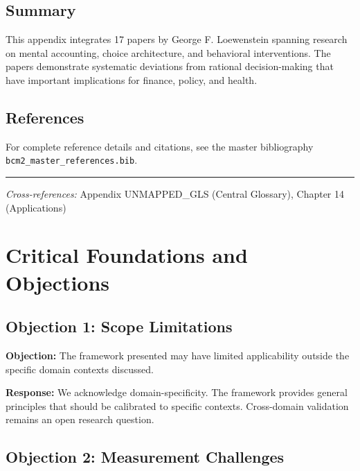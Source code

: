 \subsection{Summary}

This appendix integrates 17 papers by George F. Loewenstein
spanning research on mental accounting, choice architecture, and behavioral
interventions. The papers demonstrate systematic deviations from rational
decision-making that have important implications for finance, policy, and health.

\subsection{References}

For complete reference details and citations, see the master bibliography
\texttt{bcm2\_master\_references.bib}.

\vspace{1em}
\hrule
\vspace{0.5em}

\noindent\textit{Cross-references:}
Appendix UNMAPPED_GLS (Central Glossary), Chapter 14 (Applications)



\section{Critical Foundations and Objections}
\label{sec:loe-foundations}

\subsection{Objection 1: Scope Limitations}

\textbf{Objection:} The framework presented may have limited applicability
outside the specific domain contexts discussed.

\textbf{Response:} We acknowledge domain-specificity. The framework provides
general principles that should be calibrated to specific contexts. Cross-domain
validation remains an open research question.

\subsection{Objection 2: Measurement Challenges}

